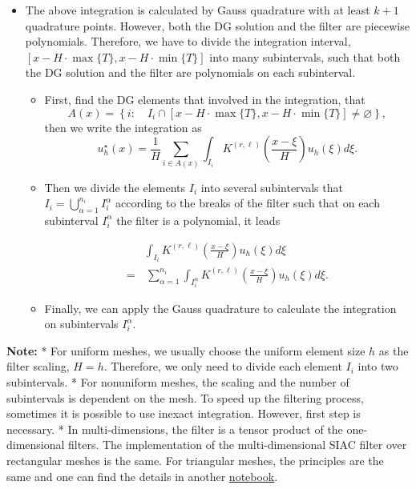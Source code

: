 \documentclass[11pt]{article}
\providecommand{\tightlist}{%
      \setlength{\itemsep}{0pt}\setlength{\parskip}{0pt}}
\begin{document}
    \begin{itemize}
\tightlist
\item
  The above integration is calculated by Gauss quadrature with at least
  \(k+1\) quadrature points. However, both the DG solution and the
  filter are piecewise polynomials. Therefore, we have to divide the
  integration interval,
  \(\left[x - H\cdot\max\{T\}, x- H\cdot\min\{T\}\right]\) into many
  subintervals, such that both the DG solution and the filter are
  polynomials on each subinterval.

  \begin{itemize}
  \tightlist
  \item
    First, find the DG elements that involved in the integration, that
    \[A(x) = \left\{i:\quad I_i \cap \left[x - H\cdot\max\{T\}, x- H\cdot\min\{T\}\right] \neq \varnothing \right\},\]
    then we write the integration as\\
    \[u_h^\star(x) = \frac{1}{H}\sum\limits_{i \in A(x)} \int_{I_{i}}K^{(r,\ell)}\left(\frac{x-\xi}{H}\right)u_h(\xi) d\xi. \]
  \item
    Then we divide the elements \(I_i\) into several subintervals that
    \(I_i = \bigcup\limits_{\alpha=1}^{n_{i}}I_{i}^\alpha\) according to
    the breaks of the filter such that on each subinterval
    \(I_{i}^\alpha\) the filter is a polynomial, it leads

    \begin{equation}
    \begin{split}
    & \int_{I_{i}}K^{(r,\ell)}\left(\frac{x-\xi}{H}\right)u_h(\xi) d\xi \\
    = &\, \sum\limits_{\alpha=1}^{n_{i}}\int_{I_{i}^\alpha}K^{(r,\ell)}\left(\frac{x-\xi}{H}\right)u_h(\xi) d\xi.
    \end{split}
    \end{equation}
  \item
    Finally, we can apply the Gauss quadrature to calculate the
    integration on subintervals \(I_{i}^\alpha\).
  \end{itemize}
\end{itemize}

    \textbf{Note:} * For uniform meshes, we usually choose the uniform
element size \(h\) as the filter scaling, \(H = h\). Therefore, we only
need to divide each element \(I_{i}\) into two subintervals. * For
nonuniform meshes, the scaling and the number of subintervals is
dependent on the mesh. To speed up the filtering process, sometimes it
is possible to use inexact integration. However, first step is
necessary. * In multi-dimensions, the filter is a tensor product of the
one-dimensional filters. The implementation of the multi-dimensional
SIAC filter over rectangular meshes is the same. For triangular meshes,
the principles are the same and one can find the details in another
\href{}{notebook}.
\end{document}
